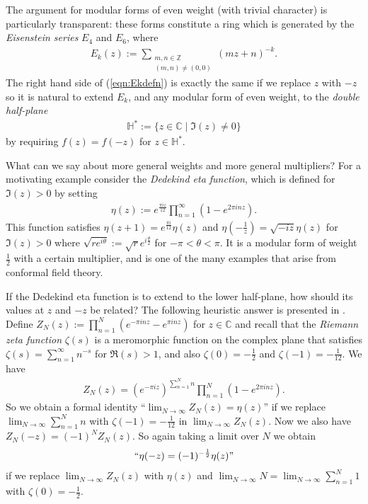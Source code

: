\documentclass[aps,prd,groupedaddress,preprint,tightenlines,eqsecnum,nofootinbib]{revtex4}
\newcommand{\CC}{{\mathbb C}}%
\newcommand{\ZZ}{{\mathbb Z}}%
\newcommand{\HH}{{\mathbb H}}%
\begin{document}
The argument for modular forms of even weight (with trivial character) is particularly transparent: these forms constitute a ring which is generated by the {\em Eisenstein series} $E_4$ and $E_6$, where
\begin{gather}\label{eqn:Ekdefn}
 E_k(z):=\sum_{\substack{m,n\in\ZZ\\(m,n)\neq (0,0)}} (mz+n)^{-k}.
\end{gather}
The right hand side of (\ref{eqn:Ekdefn}) is exactly the same if we replace $z$ with $-z$ so it is natural to extend $E_k$, and any modular form of even weight, to the {\em double half-plane} 
\begin{gather}
\HH^*:=\{z\in \CC\mid \Im(z)\neq 0\}
\end{gather} 
by requiring $f(z)=f(-z)$ for $z\in \HH^*$. 

What can we say about more general weights and more general multipliers? For a motivating example consider the {\em Dedekind eta function}, which is defined for $\Im(z)>0$ by setting 
\begin{gather}
\eta(z):=e^{\frac{\pi i z}{12}}\prod_{n=1}^\infty(1-e^{2\pi i n z}).
\end{gather} 
This function satisfies $\eta(z+1)=e^{\frac{\pi i}{12}}\eta(z)$ and $\eta(-\frac1z)=\sqrt{-iz}\eta(z)$ for $\Im(z)>0$ where $\sqrt{re^{i\theta}}:=\sqrt{r}e^{i\frac{\theta}{2}}$ for $-\pi<\theta<\pi$. It is a modular form of weight $\frac12$ with a certain multiplier, and is one of the many examples that arise from conformal field theory. 

If the Dedekind eta function is to extend to the lower half-plane, how should its values at $z$ and $-z$ be related? The following heuristic answer is presented in \cite{07T-rex1, 06T-rex2}. Define $Z_N(z):=\prod_{n=1}^N(e^{-\pi i n z}-e^{\pi i n z})$ for $z\in \CC$ and recall that the {\em Riemann zeta function} $\zeta(s)$ is a meromorphic function on the complex plane that satisfies $\zeta(s)=\sum_{n=1}^\infty n^{-s}$ for $\Re(s)>1$, and also $\zeta(0)=-\frac12$ and $\zeta(-1)=-\frac1{12}$. We have
\begin{gather}
	Z_N(z)=(e^{-\pi i z})^{\sum_{n=1}^N n}\prod_{n=1}^N(1-e^{2\pi i n z}).
\end{gather}
So we obtain a formal identity ``$\lim_{N\to \infty}Z_N(z)=\eta(z)$'' if we replace $\lim_{N\to \infty}\sum_{n=1}^N n$ with $\zeta(-1)=-\frac1{12}$ in $\lim_{N\to \infty}Z_N(z)$. Now we also have $Z_N(-z)=(-1)^NZ_N(z)$. So again taking a limit over $N$ we obtain 
\begin{gather}\label{eqn:etaRxform}
``\eta(-z)=(-1)^{-\frac12}\eta(z)"
\end{gather} 
if we replace $\lim_{N\to \infty}Z_N(z)$ with $\eta(z)$ and $\lim_{N\to \infty}N=\lim_{N\to \infty}\sum_{n=1}^N 1$ with $\zeta(0)=-\frac12$.
\end{document}
